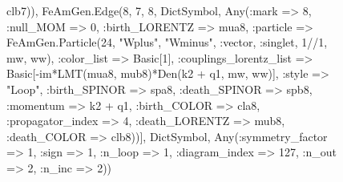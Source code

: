 \documentclass{revtex4}
\begin{document}
\begin{figure}[!htb]
\begin{center}
{clb7)), FeAmGen.Edge(8, 7, 8, Dict{Symbol, Any}(:mark => 8, :null_MOM => 0, :birth_LORENTZ => mua8, :particle => FeAmGen.Particle(24, "Wplus", "Wminus", :vector, :singlet, 1//1, mw, ww), :color_list => Basic[1], :couplings_lorentz_list => Basic[-im*LMT(mua8, mub8)*Den(k2 + q1, mw, ww)], :style => "Loop", :birth_SPINOR => spa8, :death_SPINOR => spb8, :momentum => k2 + q1, :birth_COLOR => cla8, :propagator_index => 4, :death_LORENTZ => mub8, :death_COLOR => clb8))], Dict{Symbol, Any}(:symmetry_factor => 1, :sign => 1, :n_loop => 1, :diagram_index => 127, :n_out => 2, :n_inc => 2)) 
}
\end{center}
\end{figure}
\end{document}
